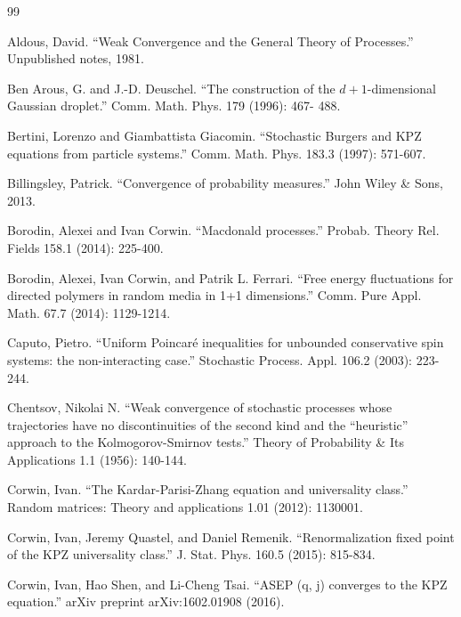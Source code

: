 \documentclass[11pt, a4paper]{article}
\newcommand{\1}{\mathbf{1}}
\begin{document}
\begin{thebibliography}{99}

    Aldous, David. ``Weak Convergence and the General Theory of Processes.'' Unpublished notes, 1981.

    Ben Arous, G. and J.-D. Deuschel. ``The construction of the $d + 1$-dimensional Gaussian droplet.'' Comm. Math. Phys. 179 (1996): 467-
488.

    Bertini, Lorenzo and Giambattista Giacomin. ``Stochastic Burgers and KPZ equations from particle systems.'' Comm. Math. Phys. 183.3 (1997): 571-607.

    Billingsley, Patrick. ``Convergence of probability measures.'' John Wiley \& Sons, 2013.
    
    Borodin, Alexei and Ivan Corwin. ``Macdonald processes.'' Probab. Theory Rel. Fields 158.1 (2014): 225-400.
            
    Borodin, Alexei, Ivan Corwin, and Patrik L. Ferrari. ``Free energy fluctuations for directed polymers in random media in 1+1 dimensions.'' Comm. Pure Appl. Math. 67.7 (2014): 1129-1214.
        
    Caputo, Pietro. ``Uniform Poincar\'e inequalities for unbounded conservative
    spin systems: the non-interacting case.'' Stochastic Process. Appl. 106.2 (2003): 223-244.

     Chentsov, Nikolai N. ``Weak convergence of stochastic processes whose
     trajectories have no discontinuities of the second kind and the
     “heuristic” approach to the Kolmogorov-Smirnov tests.'' Theory of
     Probability \& Its Applications 1.1 (1956): 140-144.
     
     Corwin, Ivan. ``The Kardar-Parisi-Zhang equation and universality class.'' Random matrices: Theory and applications 1.01 (2012): 1130001.
     
      Corwin, Ivan, Jeremy Quastel, and Daniel Remenik. ``Renormalization fixed point of the KPZ universality class.'' J. Stat. Phys. 160.5 (2015): 815-834.
      
    Corwin, Ivan, Hao Shen, and Li-Cheng Tsai. ``ASEP (q, j) converges to the KPZ equation.'' arXiv preprint arXiv:1602.01908 (2016).
      

\end{thebibliography}
\end{document}
